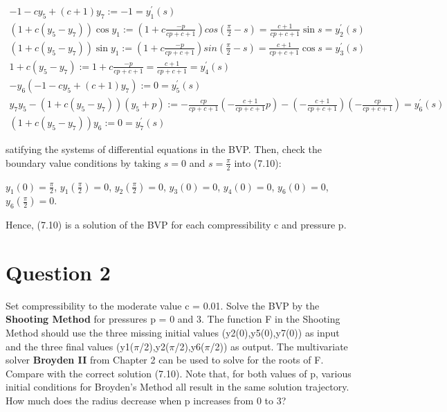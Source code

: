 \documentclass{article}
\begin{document}
$$
\begin{array}{l}
	-1-c y_{5}+(c+1) y_{7} := -1 = y^{'}_{1}(s)\\
	\left(1+c\left(y_{5}-y_{7}\right)\right) \cos y_{1} := (1+ c \frac{-p}{cp+c+1})cos(\frac{\pi}{2}-s) = \frac{c+1}{c p+c+1}\sin s = y^{'}_{2}(s)\\
	\left(1+c\left(y_{5}-y_{7}\right)\right) \sin y_{1}  := (1+ c \frac{-p}{cp+c+1})sin(\frac{\pi}{2}-s) = \frac{c+1}{c p+c+1} \cos s = y^{'}_{3}(s)\\
	1+c\left(y_{5}-y_{7}\right) :=  1+ c \frac{-p}{cp+c+1} = \frac{c+1}{c p+c+1} =  y^{'}_{4}(s)\\
	-y_{6}\left(-1-c y_{5}+(c+1) y_{7}\right) := 0 = y^{'}_{5}(s)\\
	y_{7} y_{5}-\left(1+c\left(y_{5}-y_{7}\right)\right)\left(y_{5}+p\right) := -\frac{c p}{c p+c+1} (-\frac{c+1}{c p+c+1} p)-(-\frac{c+1}{c p+c+1}) (-\frac{c p}{c p+c+1}) = y^{'}_{6}(s)\\
	\left(1+c\left(y_{5}-y_{7}\right)\right) y_{6} := 0 = y^{'}_{7}(s)
\end{array}
$$

satifying the systems of differential equations in the BVP. Then, check the boundary value conditions by taking $s=0$ and $s=\frac{\pi}{2}$ into (7.10):

$y_{1}(0)=\frac{\pi}{2}$, $y_{1}(\frac{\pi}{2})=0$,
$y_{2}(\frac{\pi}{2})=0$,
$y_{3}(0)=0$,
$y_{4}(0)=0$,
$y_{6}(0)=0$,
$y_{6}(\frac{\pi}{2})=0$. 

Hence, (7.10) is a solution of the BVP for each compressibility c and pressure p.



\section*{Question 2} 

Set compressibility to the moderate value c = 0.01. Solve the BVP by the \textbf{Shooting Method}
for pressures p = 0 and 3. The function F in the Shooting Method should use the three
missing initial values (y2(0),y5(0),y7(0)) as input and the three final values
(y1($\pi$/2),y2($\pi$/2),y6($\pi$/2)) as output. The multivariate solver \textbf{Broyden II} from Chapter 2 can be used to solve for the roots of F. Compare with the correct solution (7.10). Note that,
for both values of p, various initial conditions for Broyden’s Method all result in the same
solution trajectory. How much does the radius decrease when p increases from 0 to 3?
\end{document}
